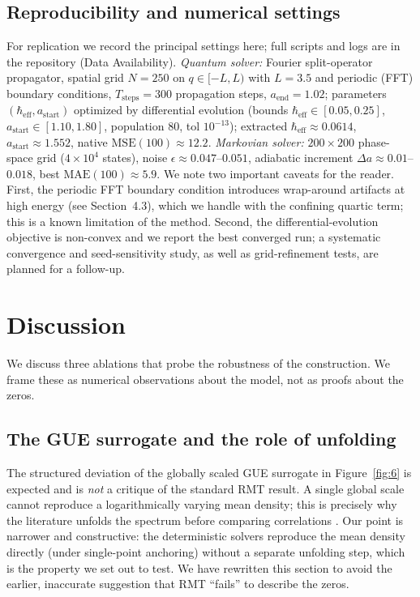 \documentclass[utf8]{FrontiersinHarvard}
\begin{document}
\subsection{Reproducibility and numerical settings}

For replication we record the principal settings here; full scripts and logs are in the repository (Data Availability). \emph{Quantum solver:} Fourier split-operator propagator, spatial grid $N=250$ on $q\in[-L,L)$ with $L=3.5$ and periodic (FFT) boundary conditions, $T_{\mathrm{steps}}=300$ propagation steps, $a_{\mathrm{end}}=1.02$; parameters $(\hbar_{\mathrm{eff}},a_{\mathrm{start}})$ optimized by differential evolution (bounds $\hbar_{\mathrm{eff}}\in[0.05,0.25]$, $a_{\mathrm{start}}\in[1.10,1.80]$, population $80$, tol $10^{-13}$); extracted $\hbar_{\mathrm{eff}}\approx0.0614$, $a_{\mathrm{start}}\approx1.552$, native $\mathrm{MSE}(100)\approx12.2$. \emph{Markovian solver:} $200\times200$ phase-space grid ($4\times10^4$ states), noise $\epsilon\approx0.047$--$0.051$, adiabatic increment $\Delta a\approx0.01$--$0.018$, best $\mathrm{MAE}(100)\approx5.9$. We note two important caveats for the reader. First, the periodic FFT boundary condition introduces wrap-around artifacts at high energy (see Section~4.3), which we handle with the confining quartic term; this is a known limitation of the method. Second, the differential-evolution objective is non-convex and we report the best converged run; a systematic convergence and seed-sensitivity study, as well as grid-refinement tests, are planned for a follow-up.

\section{Discussion}

We discuss three ablations that probe the robustness of the construction. We frame these as numerical observations about the model, not as proofs about the zeros.

\subsection{The GUE surrogate and the role of unfolding}

The structured deviation of the globally scaled GUE surrogate in Figure~\ref{fig:6} is expected and is \emph{not} a critique of the standard RMT result. A single global scale cannot reproduce a logarithmically varying mean density; this is precisely why the literature unfolds the spectrum before comparing correlations \citep{montgomery1973,odlyzko1987}. Our point is narrower and constructive: the deterministic solvers reproduce the mean density directly (under single-point anchoring) without a separate unfolding step, which is the property we set out to test. We have rewritten this section to avoid the earlier, inaccurate suggestion that RMT ``fails'' to describe the zeros.
\end{document}
